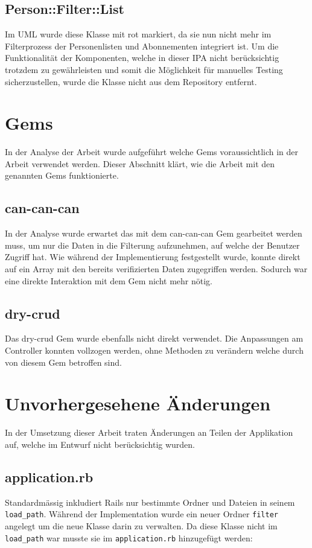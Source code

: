 \subsection{Person::Filter::List}
Im UML wurde diese Klasse mit rot markiert, da sie nun nicht mehr im Filterprozess der Personenlisten und Abonnementen integriert ist. Um die Funktionalität der Komponenten, welche in dieser IPA nicht berücksichtig trotzdem zu 
gewährleisten und somit die Möglichkeit für manuelles Testing sicherzustellen, wurde die Klasse nicht aus dem Repository entfernt. 

\section{Gems}
In der Analyse der Arbeit wurde aufgeführt welche Gems voraussichtlich in der Arbeit verwendet werden. Dieser Abschnitt klärt, wie die Arbeit mit den genannten Gems funktionierte.

\subsection{can-can-can}
In der Analyse wurde erwartet das mit dem can-can-can Gem gearbeitet werden muss, um nur die Daten in die Filterung aufzunehmen, auf welche der Benutzer Zugriff hat.
Wie während der Implementierung festgestellt wurde, konnte direkt auf ein Array mit den bereits verifizierten Daten zugegriffen werden. Sodurch war eine direkte Interaktion mit dem Gem
nicht mehr nötig.

\subsection{dry-crud}
Das dry-crud Gem wurde ebenfalls nicht direkt verwendet. Die Anpassungen am Controller konnten vollzogen werden, ohne Methoden zu verändern welche durch von diesem Gem betroffen sind.

\section{Unvorhergesehene Änderungen}
In der Umsetzung dieser Arbeit traten Änderungen an Teilen der Applikation auf, welche im Entwurf nicht berücksichtig wurden.

\subsection{application.rb}
Standardmässig inkludiert Rails nur bestimmte Ordner und Dateien in seinem \texttt{load\_path}. Während der Implementation wurde ein neuer Ordner \texttt{filter}
angelegt um die neue Klasse darin zu verwalten. Da diese Klasse nicht im \texttt{load\_path} war musste sie im \texttt{application.rb} hinzugefügt werden:

